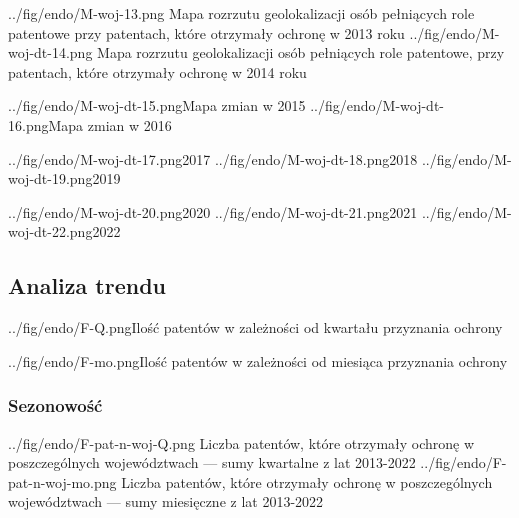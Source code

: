   \figsides
{../fig/endo/M-woj-13.png}
{ Mapa rozrzutu geolokalizacji osób pełniących role patentowe 
  przy patentach, które otrzymały ochronę w 2013 roku}
{../fig/endo/M-woj-dt-14.png}
{ Mapa rozrzutu geolokalizacji osób pełniących role patentowe, 
  przy patentach, które otrzymały ochronę w 2014 roku}

  \newpage\figsides
{../fig/endo/M-woj-dt-15.png}{Mapa zmian w 2015}
{../fig/endo/M-woj-dt-16.png}{Mapa zmian w 2016}

  \figsidesTri
{../fig/endo/M-woj-dt-17.png}{2017}
{../fig/endo/M-woj-dt-18.png}{2018}
{../fig/endo/M-woj-dt-19.png}{2019}

  \figsidesTri
{../fig/endo/M-woj-dt-20.png}{2020}
{../fig/endo/M-woj-dt-21.png}{2021}
{../fig/endo/M-woj-dt-22.png}{2022}



  \newpage



  \newpage\subsection
{Analiza trendu}



  \fig
{../fig/endo/F-Q.png}{Ilość patentów w zależności od kwartału przyznania ochrony}

  \fig
{../fig/endo/F-mo.png}{Ilość patentów w zależności od miesiąca przyznania ochrony}





  \newpage\subsubsection
{Sezonowość}

  \figsides
{../fig/endo/F-pat-n-woj-Q.png}
{ Liczba patentów, które otrzymały ochronę w poszczególnych województwach 
  --- sumy kwartalne z lat 2013-2022 }
{../fig/endo/F-pat-n-woj-mo.png}
{ Liczba patentów, które otrzymały ochronę w poszczególnych województwach 
  --- sumy miesięczne z lat 2013-2022 }